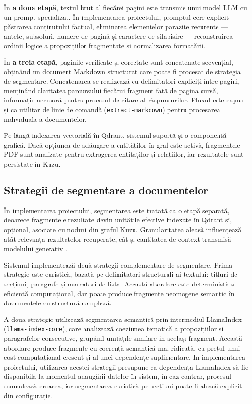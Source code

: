 \documentclass[12pt, a4paper, oneside, romanian]{teza-upb}
\begin{document}
În \textbf{a doua etapă}, textul brut al fiecărei pagini este transmis unui model LLM cu un prompt specializat. În implementarea proiectului, promptul cere explicit păstrarea conținutului factual, eliminarea elementelor parazite recurente — antete, subsoluri, numere de pagină și caractere de silabisire — reconstruirea ordinii logice a propozițiilor fragmentate și normalizarea formatării.

În \textbf{a treia etapă}, paginile verificate și corectate sunt concatenate secvențial, obținând un document Markdown structurat care poate fi procesat de strategia de segmentare. Concatenarea se realizează cu delimitatori expliciți între pagini, menținând claritatea parcursului fiecărui fragment față de pagina sursă, informație necesară pentru procesul de citare al răspunsurilor. Fluxul este expus și ca utilitar de linie de comandă (\texttt{extract-markdown}) pentru procesarea individuală a documentelor.



Pe lângă indexarea vectorială în Qdrant,  sistemul suportă și  o componentă grafică. Dacă opțiunea de adăugare a entităților în graf este activă, fragmentele PDF sunt analizate pentru extragerea entităților și relațiilor, iar rezultatele sunt persistate în Kuzu.

\subsection{Strategii de segmentare a documentelor}

În implementarea proiectului, segmentarea este tratată ca o etapă separată, deoarece fragmentele rezultate devin unitățile efective indexate în Qdrant și, opțional, asociate cu noduri din graful Kuzu. Granularitatea aleasă influențează atât relevanța rezultatelor recuperate, cât și cantitatea de context transmisă modelului generativ \cite{gao2023retrieval}.

Sistemul implementează două strategii complementare de segmentare. Prima strategie este euristică, bazată pe delimitatori structurali ai textului: titluri de secțiuni, paragrafe și marcatori de listă. Această abordare este deterministă și eficientă computațional, dar poate produce fragmente neomogene semantic în documentele cu structură complexă.

A doua strategie utilizează segmentarea semantică prin intermediul LlamaIndex (\texttt{llama-index-core}), care analizează coeziunea tematică a propozițiilor și paragrafelor consecutive, grupând unitățile similare în același fragment. Această abordare produce fragmente cu coerență semantică mai ridicată, cu prețul unui cost computațional crescut și al unei dependențe suplimentare. În implementarea proiectului, utilizarea acestei strategii presupune ca dependența LlamaIndex să fie disponibilă la momentul adaugării datelor în sistem, în caz contrar, procesul semnalează eroarea, iar segmentarea euristică pe secțiuni poate fi aleasă explicit din configurație.
\end{document}
